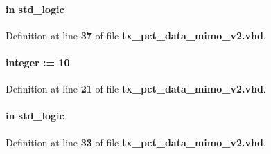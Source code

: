 \paragraph[{fifo\+\_\+rclk}]{ {\bfseries \textcolor{keywordflow}{in}\textcolor{vhdlchar}{ }} {\bfseries \textcolor{comment}{std\+\_\+logic}\textcolor{vhdlchar}{ }} \hspace{0.3cm}{\ttfamily [Port]}}\label{classtx__pct__data__mimo__v2_a55bba49a6eee1be8306afc2b165c4586}


Definition at line {\bf 37} of file {\bf tx\+\_\+pct\+\_\+data\+\_\+mimo\+\_\+v2.\+vhd}.

\paragraph[{fifo\+\_\+size}]{ {\bfseries \textcolor{vhdlchar}{ }} {\bfseries \textcolor{comment}{integer}\textcolor{vhdlchar}{ }\textcolor{vhdlchar}{ }\textcolor{vhdlchar}{\+:}\textcolor{vhdlchar}{=}\textcolor{vhdlchar}{ }\textcolor{vhdlchar}{ } \textcolor{vhdldigit}{10} \textcolor{vhdlchar}{ }} \hspace{0.3cm}{\ttfamily [Generic]}}\label{classtx__pct__data__mimo__v2_a22180059fd8cb98bf508670c8fe15583}


Definition at line {\bf 21} of file {\bf tx\+\_\+pct\+\_\+data\+\_\+mimo\+\_\+v2.\+vhd}.

\paragraph[{fifo\+\_\+wclk}]{ {\bfseries \textcolor{keywordflow}{in}\textcolor{vhdlchar}{ }} {\bfseries \textcolor{comment}{std\+\_\+logic}\textcolor{vhdlchar}{ }} \hspace{0.3cm}{\ttfamily [Port]}}\label{classtx__pct__data__mimo__v2_ad816c4d6f187ff1a9c6480fbdd3b7e52}


Definition at line {\bf 33} of file {\bf tx\+\_\+pct\+\_\+data\+\_\+mimo\+\_\+v2.\+vhd}.

